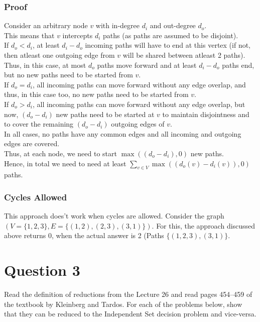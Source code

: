 \documentclass[11pt, fleqn]{article}
\begin{document}
\subsubsection*{Proof}
Consider an arbitrary node $v$ with in-degree $d_i$ and out-degree $d_o$.\\
This means that $v$ intercepts $d_i$ paths (as paths are assumed to be disjoint).\\
If $d_o < d_i$, at least $d_i - d_o$ incoming paths will have to end at this vertex (if not, then atleast one outgoing edge from $v$ will be shared between atleast 2 paths). Thus, in this case, at most $d_o$ paths move forward and at least $d_i - d_o$ paths end, but no new paths need to be started from $v$.\\
If $d_o = d_i$, all incoming paths can move forward without any edge overlap, and thus, in this case too, no new paths need to be started from $v$.\\
If $d_o > d_i$, all incoming paths can move forward without any edge overlap, but now, $(d_o - d_i)$ new paths need to be started at $v$ to maintain disjointness and to cover the remaining $(d_o - d_i)$ outgoing edges of $v$.\\
In all cases, no paths have any common edges and all incoming and outgoing edges are covered.\\ 
Thus, at each node, we need to start $\max{((d_o - d_i), 0)}$ new paths.\\
Hence, in total we need to need at least $\sum_{v \in V}\max{((d_o(v) - d_i(v)), 0)}$ paths.

\subsubsection*{Cycles Allowed}
This approach does't work when cycles are allowed. Consider the graph $(V = \{1, 2, 3\}, E = \{(1,2), (2,3), (3, 1)\})$. For this, the approach discussed above returns 0, when the actual answer is 2 (Paths $\{(1, 2, 3), (3, 1)\}$.


\newpage 
\section*{Question 3}
\label{q3}
\setcounter{equation}{0}

Read the definition of reductions from the Lecture 26 and read pages 454–459 of the textbook by Kleinberg and Tardos. For each of the problems below, show that they can be reduced to the Independent Set decision problem and vice-versa.
\end{document}
